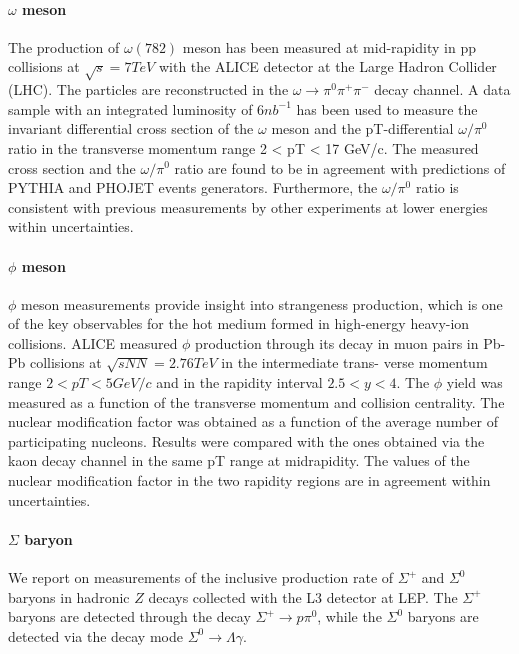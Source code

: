 \documentclass[
10pt, %
a4paper, %
oneside, %
headinclude,footinclude, %
BCOR5mm, %
]{scrartcl}
\begin{document}
\paragraph{$\omega$ meson}The production of $\omega(782)$ meson has been measured at mid-rapidity in pp collisions at $\sqrt{s} = 7 TeV$ with the ALICE detector at the Large Hadron Collider (LHC). The particles are reconstructed in the $\omega\rightarrow\pi^0\pi^+\pi^-$ decay channel. A data sample with an integrated luminosity of $6 nb^{-1}$ has been used to measure the invariant differential cross section of the $\omega$ meson and the pT-differential $\omega/\pi^0$ ratio in the transverse momentum range 2 < pT < 17 GeV/c. The measured cross section and the $\omega/\pi^0$ ratio are found to be in agreement with predictions of PYTHIA and PHOJET events generators. Furthermore, the $\omega/\pi^0$ ratio is consistent with previous measurements by other experiments at lower energies within uncertainties.\cite{ALICE-PUBLIC-2018-004}

\paragraph{$\phi$ meson}$\phi$ meson measurements provide insight into strangeness production, which is one of the key observables for the hot medium formed in high-energy heavy-ion collisions. ALICE measured $\phi$ production through its decay in muon pairs in Pb-Pb collisions at $\sqrt{sNN} = 2.76 TeV$ in the intermediate trans- verse momentum range $2 < pT < 5 GeV/c$ and in the rapidity interval $2.5 < y < 4$. The $\phi$ yield was measured as a function of the transverse momentum and collision centrality. The nuclear modification factor was obtained as a function of the average number of participating nucleons. Results were compared with the ones obtained via the kaon decay channel in the same pT range at midrapidity. The values of the nuclear modification factor in the two rapidity regions are in agreement within uncertainties.\cite{Acharya:2314216}

\paragraph{$\Sigma$ baryon}We report on measurements of the inclusive production rate of $\Sigma^+$ and $\Sigma^0$ baryons in hadronic $Z$ decays collected with the L3 detector at LEP. The $\Sigma^+$ baryons are detected through the decay $\Sigma^+ \rightarrow p\pi^0$, while the $\Sigma^0$ baryons are detected via the decay mode $\Sigma^0\rightarrow\Lambda\gamma$\cite{Acciarri:427619}.
\end{document}
